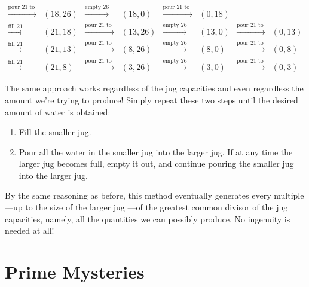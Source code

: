 \[\begin{array}{cccccccc}
\xrightarrow{\text{pour 21 to 26}} & (18,26)& \xrightarrow{\text{empty
    26}} & (18,0)& \xrightarrow{\text{pour 21 to 26}} &
(0,18)\\ \xrightarrow{\text{fill 21}} & (21,18)&
\xrightarrow{\text{pour 21 to 26}} & (13,26)& \xrightarrow{\text{empty
    26}} & (13,0)& \xrightarrow{\text{pour 21 to 26}} &
(0,13)\\ \xrightarrow{\text{fill 21}} & (21,13)&
\xrightarrow{\text{pour 21 to 26}} & (8,26)& \xrightarrow{\text{empty
    26}} & (8,0)& \xrightarrow{\text{pour 21 to 26}} &
(0,8)\\ \xrightarrow{\text{fill 21}} & (21,8)& \xrightarrow{\text{pour
    21 to 26}} & (3,26)& \xrightarrow{\text{empty 26}} & (3,0)&
\xrightarrow{\text{pour 21 to 26}} & (0,3)
\end{array}
\]

The same approach works regardless of the jug capacities and even
regardless the amount we're trying to produce!  Simply repeat these
two steps until the desired amount of water is obtained:
\begin{enumerate}
\item Fill the smaller jug.

\item Pour all the water in the smaller jug into the larger jug.  If
  at any time the larger jug becomes full, empty it out, and continue
  pouring the smaller jug into the larger jug.
\end{enumerate}
By the same reasoning as before, this method eventually generates
every multiple ---up to the size of the larger jug ---of the greatest
common divisor of the jug capacities, namely, all the quantities we
can possibly produce.  No ingenuity is needed at all!

\begin{problems}

\practiceproblems {} 

\classproblems {}

\homeworkproblems {}
 

\end{problems}

\section{Prime Mysteries}

